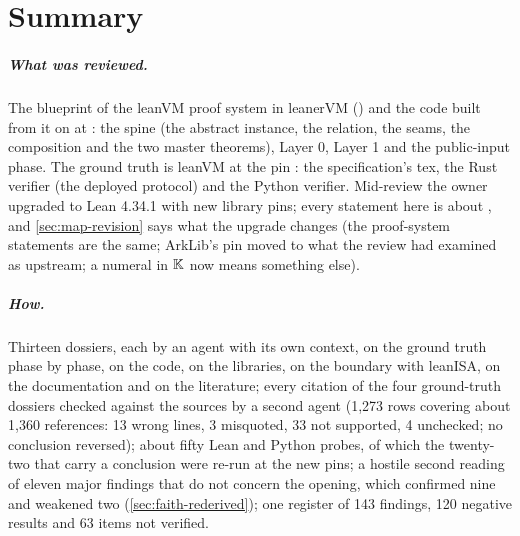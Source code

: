 \chapter*{Summary}

\paragraph{What was reviewed.} The blueprint of the leanVM proof system in leanerVM
() and the code built from it on  at
: the spine (the abstract instance, the relation, the seams, the composition and
the two master theorems), Layer 0, Layer 1 and the public-input phase. The ground truth is
leanVM at the pin : the specification's tex, the Rust verifier (the deployed
protocol) and the Python verifier. Mid-review the owner upgraded  to Lean 4.34.1 with
new library pins; every statement here is about , and \cref{sec:map-revision}
says what the upgrade changes (the proof-system statements are the same; ArkLib's pin moved to
what the review had examined as upstream; a numeral in $\mathbb{K}$ now means something else).

\paragraph{How.} Thirteen dossiers, each by an agent with its own context, on the ground truth
phase by phase, on the code, on the libraries, on the boundary with leanISA, on the
documentation and on the literature; every citation of the four ground-truth dossiers checked
against the sources by a second agent (1,273 rows covering about 1,360 references: 13 wrong
lines, 3 misquoted, 33 not supported, 4 unchecked; no conclusion reversed); about fifty Lean and
Python probes, of which the twenty-two that carry a conclusion were re-run at the new pins; a
hostile second reading of eleven major findings that do not concern the opening, which
confirmed nine and weakened two (\cref{sec:faith-rederived}); one register of 143 findings, 120 negative results
and 63 items not verified.

